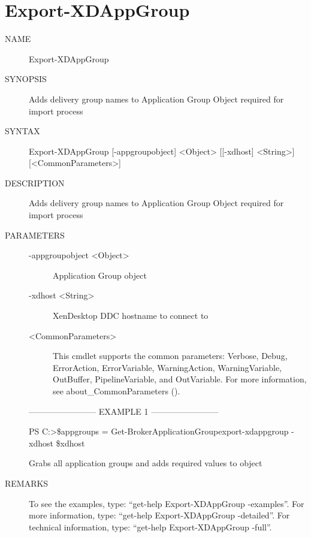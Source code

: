 \documentclass[letterpaper,10pt,english]{sphinxmanual}
\begin{document}
\section{Export-XDAppGroup}
\label{\detokenize{cmd_export:export-xdappgroup}}\begin{description}
\item[{NAME}] \leavevmode
Export-XDAppGroup

\item[{SYNOPSIS}] \leavevmode
Adds delivery group names to Application Group Object required for import process

\item[{SYNTAX}] \leavevmode
Export-XDAppGroup {[}-appgroupobject{]} \textless{}Object\textgreater{} {[}{[}-xdhost{]} \textless{}String\textgreater{}{]} {[}\textless{}CommonParameters\textgreater{}{]}

\item[{DESCRIPTION}] \leavevmode
Adds delivery group names to Application Group Object required for import process

\item[{PARAMETERS}] \leavevmode\begin{description}
\item[{-appgroupobject \textless{}Object\textgreater{}}] \leavevmode
Application Group object

\item[{-xdhost \textless{}String\textgreater{}}] \leavevmode
XenDesktop DDC hostname to connect to

\item[{\textless{}CommonParameters\textgreater{}}] \leavevmode
This cmdlet supports the common parameters: Verbose, Debug,
ErrorAction, ErrorVariable, WarningAction, WarningVariable,
OutBuffer, PipelineVariable, and OutVariable. For more information, see
about\_CommonParameters ().

\end{description}

————————\textendash{} EXAMPLE 1 ————————\textendash{}

PS C:\textgreater{}\$appgroups = Get-BrokerApplicationGroup\textbar{}export-xdappgroup -xdhost \$xdhost

Grabs all application groups and adds required values to object

\item[{REMARKS}] \leavevmode
To see the examples, type: “get-help Export-XDAppGroup -examples”.
For more information, type: “get-help Export-XDAppGroup -detailed”.
For technical information, type: “get-help Export-XDAppGroup -full”.

\end{description}
\end{document}
